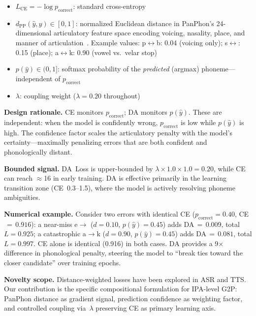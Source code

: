 \documentclass[conference]{IEEEtran}
\newcommand{\dpp}{d_{\mathrm{PP}}}        %
\newcommand{\LCE}{L_{\mathrm{CE}}}        %
\newcommand{\lam}{\lambda}                %
\begin{document}
\begin{itemize}
  \item $\LCE = -\log p_\mathrm{correct}$: standard cross-entropy
  \item $\dpp(\hat{y}, y) \in [0,1]$: normalized Euclidean distance
        in PanPhon's 24-dimensional articulatory feature space
        encoding voicing, nasality, place, and manner of
        articulation~\cite{mortensen2016panphon}.
        Example values: p$\leftrightarrow$b: 0.04 (voicing only);
        s$\leftrightarrow$: 0.15 (place);
        a$\leftrightarrow$k: 0.90 (vowel vs.\ velar stop)
  \item $p(\hat{y}) \in (0,1]$: softmax probability of the
        \emph{predicted} (argmax) phoneme---independent of
        $p_\mathrm{correct}$
  \item $\lam$: coupling weight ($\lam\!=\!0.20$ throughout)
\end{itemize}

\textbf{Design rationale.}
CE monitors $p_\mathrm{correct}$; DA monitors $p(\hat{y})$.
These are independent: when the model is confidently wrong,
$p_\mathrm{correct}$ is low while $p(\hat{y})$ is high.
The confidence factor scales the articulatory penalty with the
model's certainty---maximally penalizing errors that are both
confident and phonologically distant.

\textbf{Bounded signal.}
DA~Loss is upper-bounded by $\lam\!\times\!1.0\!\times\!1.0=0.20$,
while CE can reach $\approx$16 in early training.
DA is effective primarily in the learning transition zone
(CE~0.3--1.5), where the model is actively resolving phoneme
ambiguities.

\textbf{Numerical example.}
Consider two errors with identical CE ($p_\mathrm{correct}\!=\!0.40$,
CE$\,=\,0.916$):
a near-miss e$\to$ ($d\!=\!0.10$, $p(\hat{y})\!=\!0.45$)
adds DA$\,=\,0.009$, total $L\!=\!0.925$;
a catastrophic a$\to$k ($d\!=\!0.90$, $p(\hat{y})\!=\!0.45$) adds
DA$\,=\,0.081$, total $L\!=\!0.997$.
CE alone is identical (0.916) in both cases.
DA provides a 9$\times$ difference in phonological penalty, steering
the model to ``break ties toward the closer candidate'' over training
epochs.

\textbf{Novelty scope.}
Distance-weighted losses have been explored in ASR and TTS.
Our contribution is the specific compositional formulation for
IPA-level G2P: PanPhon distance as gradient signal, prediction
confidence as weighting factor, and controlled coupling via~$\lam$
preserving CE as primary learning axis.
\end{document}
